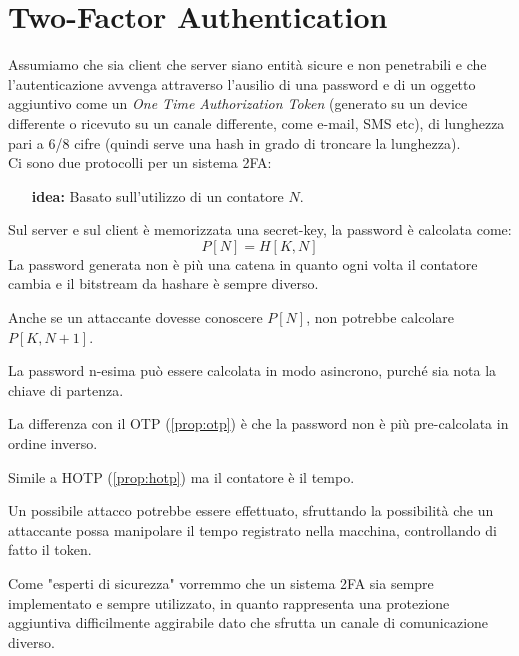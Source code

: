 \section{Two-Factor Authentication}
Assumiamo che sia client che server siano entità sicure e non penetrabili e che l'autenticazione avvenga attraverso l'ausilio di una password e di un oggetto aggiuntivo come un \textit{One Time Authorization Token} (generato su un device differente o ricevuto su un canale differente, come e-mail, SMS etc), di lunghezza pari a 6/8 cifre (quindi serve una hash in grado di troncare la lunghezza).\\
Ci sono due protocolli per un sistema 2FA:
\begin{proposition}\label{prop:hotp}
\begin{itemize}
    \item [\textbf{idea:}]Basato sull'utilizzo di un contatore $N$.
\end{itemize}
Sul server e sul client è memorizzata una secret-key, la password è calcolata come: 
\begin{equation*}
    P[N]=H[K,N]
\end{equation*}
La password generata non è più una catena in quanto ogni volta il contatore cambia e il bitstream da hashare è sempre diverso.
\end{proposition}
\begin{note}
Anche se un attaccante dovesse conoscere $P[N]$, non potrebbe calcolare $P[K,N+1]$.
\end{note}
\begin{note}
La password n-esima può essere calcolata in modo asincrono, purché sia nota la chiave di partenza.
\end{note}
\begin{note}
La differenza con il OTP (\cref{prop:otp}) è che la password non è più pre-calcolata in ordine inverso. 
\end{note}
\begin{proposition}\label{ prop:totp}
Simile a HOTP (\cref{prop:hotp}) ma il contatore è il tempo.
\end{proposition}
\begin{note}
Un possibile attacco potrebbe essere effettuato, sfruttando la possibilità che un attaccante possa manipolare il tempo registrato nella macchina, controllando di fatto il token.
\end{note}
\begin{corollary}
Come "esperti di sicurezza" vorremmo che un sistema 2FA sia sempre implementato e sempre utilizzato, in quanto rappresenta una protezione aggiuntiva difficilmente aggirabile dato che sfrutta un canale di comunicazione diverso.
\end{corollary}
